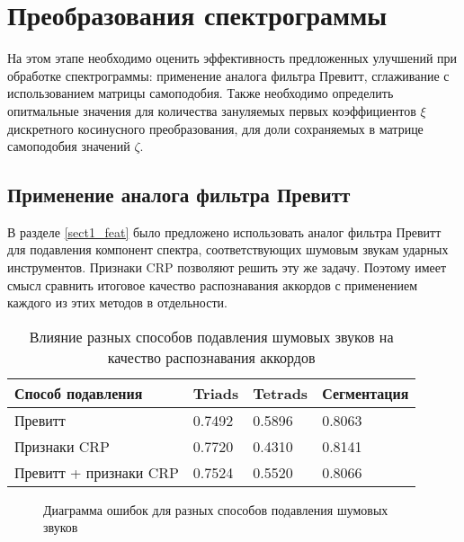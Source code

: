 \section{Преобразования спектрограммы} \label{sect3_specttrans}

На этом этапе необходимо оценить эффективность предложенных улучшений при
обработке спектрограммы: применение аналога фильтра Превитт, сглаживание с
использованием матрицы самоподобия. Также необходимо определить опитмальные
значения для количества зануляемых первых коэффициентов $\xi$ дискретного
косинусного преобразования, для доли сохраняемых в матрице самоподобия значений
$\zeta$.

\subsection{Применение аналога фильтра Превитт} \label{ssect3_prewitt}

В разделе \ref{sect1_feat} было предложено использовать аналог фильтра Превитт
для подавления компонент спектра, соответствующих шумовым звукам ударных
инструментов. Признаки CRP позволяют решить эту же задачу. Поэтому имеет смысл
сравнить итоговое качество распознавания аккордов с применением каждого из этих
методов в отдельности.

\begin{table} [htbp]
  \centering
  \parbox{15cm}{\caption{Влияние разных способов подавления шумовых звуков на
  качество распознавания аккордов} \label{TPrewitt}}
  \begin{tabular}{|l|l|l|l|}
  \hline
  Способ подавления & Triads & Tetrads & Сегментация \\
  \hline
  Превитт & 0.7492 & 0.5896 & 0.8063 \\
  Признаки CRP & 0.7720 & 0.4310 & 0.8141 \\
  Превитт + признаки CRP & 0.7524 & 0.5520 & 0.8066 \\
  \hline
  \end{tabular}
\end{table}

\begin{figure}[h]
  \begin{minipage}[h]{0.49\linewidth}
  \end{minipage}
  \hfill
  \begin{minipage}[h]{0.49\linewidth}
  \end{minipage}
  \caption{Диаграмма ошибок для разных способов подавления шумовых звуков}
  \label{img:prewitt}
\end{figure}

